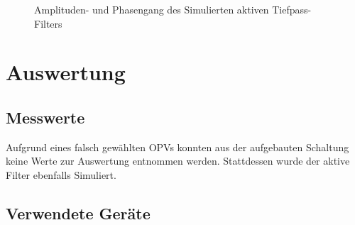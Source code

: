 \documentclass[a4paper]{hitec}
\begin{document}
\begin{figure}[H]
    \centering
    
    \caption{Amplituden- und Phasengang des Simulierten aktiven Tiefpass-Filters}
\end{figure}

\clearpage

\section{Auswertung}

\subsection{Messwerte}

Aufgrund eines falsch gewählten OPVs konnten aus der aufgebauten Schaltung keine Werte zur Auswertung entnommen werden. Stattdessen wurde der aktive Filter ebenfalls Simuliert.

\subsection{Verwendete Geräte}

\medskip

\begin{devicelist}
\end{devicelist}

\vfill

\IncludeHistoryTimeline
\end{document}
